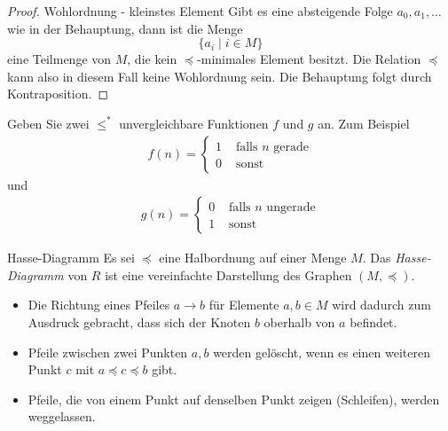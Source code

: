     \begin{proof}{Wohlordnung - kleinstes Element}
    Gibt es eine absteigende Folge $a_0,a_1,\dots$ wie in der Behauptung, dann ist die Menge
    \[
    \{a_i\mid i\in M\}
    \]
    eine Teilmenge von $M$, die kein $\preceq$-minimales Element besitzt. Die Relation $\preceq$ kann also in diesem Fall keine Wohlordnung sein. Die Behauptung folgt durch Kontraposition.
    \end{proof}


    \begin{example}
        Geben Sie zwei $\leq^*$ unvergleichbare Funktionen $f$ und $g$ an.
        \tcblower
        Zum Beispiel
            \begin{align*}
                f(n) =  \begin{cases}
                            1&\text{ falls $n$ gerade}\\
                            0&\text{ sonst}
                        \end{cases}
            \end{align*}
            und
            \begin{align*}
                g(n) =  \begin{cases}
                            0&\text{ falls $n$ ungerade}\\
                            1&\text{ sonst}
                        \end{cases}
            \end{align*}
    \end{example}

    \begin{definition}{Hasse-Diagramm}
    Es sei $\preceq$ eine Halbordnung auf einer Menge $M$. Das \textit{Hasse-Diagramm} von $R$ ist eine vereinfachte Darstellung des Graphen $(M,\preceq)$.
    \begin{itemize}
    \item Die Richtung eines Pfeiles $a\to b$ für Elemente $a,b\in M$ wird dadurch zum Ausdruck gebracht, dass sich der Knoten $b$ oberhalb von $a$ befindet.
    \item Pfeile zwischen zwei Punkten $a,b$ werden gelöscht, wenn es einen weiteren Punkt $c$ mit $a\preceq c\preceq b$ gibt.
    \item Pfeile, die von einem Punkt auf denselben Punkt zeigen (Schleifen), werden weggelassen.
    \end{itemize}
    \end{definition}

  